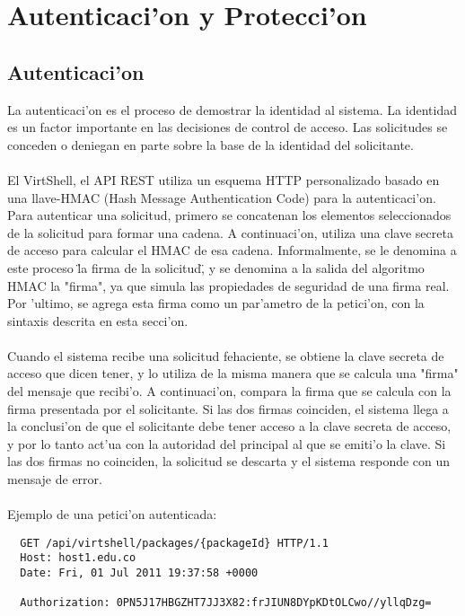 \chapter{Autenticaci'on y Protecci'on}
\label{capauthentication}

\section{Autenticaci'on}
La autenticaci'on es el proceso de demostrar la identidad al sistema. La identidad es un factor importante en las decisiones de control de acceso. Las solicitudes se conceden o deniegan en parte sobre la base de la identidad del solicitante.\\
\\
El VirtShell, el API REST utiliza un esquema HTTP personalizado basado en una llave-HMAC (Hash Message Authentication Code) para la autenticaci'on. Para autenticar una solicitud, primero se concatenan los elementos seleccionados de la solicitud para formar una cadena. A continuaci'on, utiliza una clave secreta de acceso para calcular el HMAC de esa cadena. Informalmente, se le denomina a este proceso \"la firma de la solicitud\", y se denomina a la salida del algoritmo HMAC la "firma", ya que simula las propiedades de seguridad de una firma real. Por 'ultimo, se agrega esta firma como un par'ametro de la petici'on, con la sintaxis descrita en esta secci'on.\\
\\
Cuando el sistema recibe una solicitud fehaciente, se obtiene la clave secreta de acceso que dicen tener, y lo utiliza de la misma manera que se calcula una "firma" del mensaje que recibi'o. A continuaci'on, compara la firma que se calcula con la firma presentada por el solicitante. Si las dos firmas coinciden, el sistema llega a la conclusi'on de que el solicitante debe tener acceso a la clave secreta de acceso, y por lo tanto act'ua con la autoridad del principal al que se emiti'o la clave. Si las dos firmas no coinciden, la solicitud se descarta y el sistema responde con un mensaje de error.\\
\\
Ejemplo de una petici'on autenticada:

\medskip
\begin{lstlisting}
  GET /api/virtshell/packages/{packageId} HTTP/1.1
  Host: host1.edu.co
  Date: Fri, 01 Jul 2011 19:37:58 +0000

  Authorization: 0PN5J17HBGZHT7JJ3X82:frJIUN8DYpKDtOLCwo//yllqDzg= 
\end{lstlisting}

